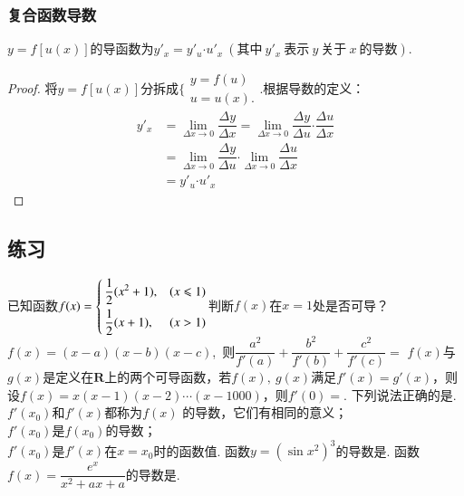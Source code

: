 \subsubsection{复合函数导数}
$ y=f\left[u(x)\right] $的导函数为$ y'_x=y'_u\bm{\cdot}u'_x~(\text{其中}~y'_x~\text{表示}~y~\text{关于}~x~\text{的导数}) $.
\begin{proof}
将$ y=f\left[u(x)\right] $分拆成$ \Bigg\{\begin{aligned}
y=f(u)\\
u=u(x).
\end{aligned} $.根据导数的定义：\begin{equation*}
\begin{aligned}
y'_x&=\lim \limits_{\Delta x \to 0}\dfrac{\Delta y}{\Delta x}=\lim \limits_{\Delta x \to 0}\dfrac{\Delta y}{\Delta u}\bm{\cdot}\dfrac{\Delta u}{\Delta x}\\
&=\lim \limits_{\Delta x \to 0}\dfrac{\Delta y}{\Delta u}\bm{\cdot}\lim \limits_{\Delta x \to 0}\dfrac{\Delta u}{\Delta x}\\
&=y'_u\bm{\cdot}u'_x
\end{aligned}
\end{equation*}
\end{proof}
\subsection{练习}
\begin{questions}

\question 已知函数$f(x)=\begin{dcases}
\,\dfrac{1}{2}(x^2+1),&(x\le 1)\\
\,\dfrac{1}{2}(x+1),&(x>1)
\end{dcases}$判断$f(x)$在$ x=1 $处是否可导？
\qs $f(x)=(x-a)(x-b)(x-c)$,~则$ \dfrac{a^2}{f'(a)}+\dfrac{b^2}{f'(b)}+\dfrac{c^2}{f'(c)}= $\xx
{}
\qs $f(x)$与$g(x)$是定义在$ \mathbf{R} $上的两个可导函数，若$ f(x),~g(x) $满足$ f'(x)=g'(x) $，则\xx
{}
\qs 设$ f(x)=x(x-1)(x-2)\cdots(x-1000) $，则$ f'(0)= $\tk.
\qs 下列说法正确的是\tk.\\
 $ f'(x_0) $和$ f'(x) $都称为$ f(x)$ 的导数，它们有相同的意义；\\
 $ f'(x_0) $是$f(x_0)$的导数；\\
 $ f'(x_0) $是$f'(x)$在$ x=x_0 $时的函数值.
\qs 函数$ y=(\sin x^2)^3 $的导数是\tk.
\qs 函数$f(x)=\dfrac{e^x}{x^2+ax+a}$的导数是\tk.
\end{questions}